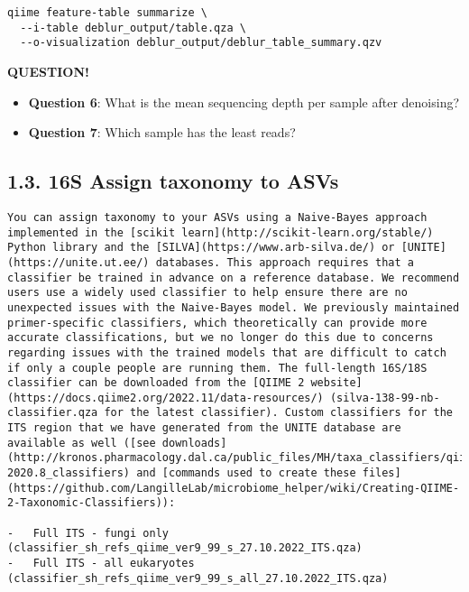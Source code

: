 \documentclass[
]{book}
\providecommand{\tightlist}{%
  \setlength{\itemsep}{0pt}\setlength{\parskip}{0pt}}
\newenvironment{bluebox}{
  \definecolor{shadecolor}{RGB}{172, 210, 237}
  \color{white}
  \begin{shaded}}
 {\end{shaded}}
\begin{document}
\begin{verbatim}
qiime feature-table summarize \
  --i-table deblur_output/table.qza \
  --o-visualization deblur_output/deblur_table_summary.qzv
\end{verbatim}

\begin{bluebox}

\begin{center}
\textbf{QUESTION!}

\end{center}

\begin{itemize}
\tightlist
\item
  \textbf{Question 6}: What is the mean sequencing depth per sample after denoising?
\item
  \textbf{Question 7}: Which sample has the least reads?
\end{itemize}

\end{bluebox}

\subsection{1.3. 16S Assign taxonomy to ASVs}\label{s-assign-taxonomy-to-asvs}

\begin{verbatim}
You can assign taxonomy to your ASVs using a Naive-Bayes approach implemented in the [scikit learn](http://scikit-learn.org/stable/) Python library and the [SILVA](https://www.arb-silva.de/) or [UNITE](https://unite.ut.ee/) databases. This approach requires that a classifier be trained in advance on a reference database. We recommend users use a widely used classifier to help ensure there are no unexpected issues with the Naive-Bayes model. We previously maintained primer-specific classifiers, which theoretically can provide more accurate classifications, but we no longer do this due to concerns regarding issues with the trained models that are difficult to catch if only a couple people are running them. The full-length 16S/18S classifier can be downloaded from the [QIIME 2 website](https://docs.qiime2.org/2022.11/data-resources/) (silva-138-99-nb-classifier.qza for the latest classifier). Custom classifiers for the ITS region that we have generated from the UNITE database are available as well ([see downloads](http://kronos.pharmacology.dal.ca/public_files/MH/taxa_classifiers/qiime2-2020.8_classifiers) and [commands used to create these files](https://github.com/LangilleLab/microbiome_helper/wiki/Creating-QIIME-2-Taxonomic-Classifiers)):

-   Full ITS - fungi only (classifier_sh_refs_qiime_ver9_99_s_27.10.2022_ITS.qza)
-   Full ITS - all eukaryotes (classifier_sh_refs_qiime_ver9_99_s_all_27.10.2022_ITS.qza)
\end{verbatim}
\end{document}
